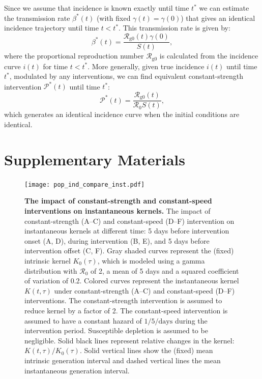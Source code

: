 \documentclass[12pt]{article}
\newcommand{\Rx}[1]{\ensuremath{{\mathcal R}_{#1}}\xspace}
\newcommand{\Ro}{\Rx{0}}
\newcommand{\Rcori}{\Rx{\mathrm{g0}}}
\newcommand{\PP}{\ensuremath{\mathcal P}}
\begin{document}
Since we assume that incidence is known exactly until time $t^\ast$ we can estimate the transmission rate $\beta^\ast(t)$ (with fixed $\gamma(t)=\gamma(0)$) that gives an identical incidence trajectory until time $t < t^\ast$.
This transmission rate is given by:
\begin{equation}
\beta^\ast(t) = \frac{\Rcori(t)\gamma(0)}{S(t)},
\end{equation}
where the proportional reproduction number $\Rcori$ is calculated from the incidence curve $i(t)$ for time $t < t^\ast$.
More generally, given true incidence $i(t)$ until time $t^\ast$, modulated by any interventions, we can find equivalent constant-strength intervention $\PP^\ast(t)$ until time $t^\ast$:
\begin{equation}
\PP^\ast(t) = \frac{\Rcori(t)}{\Ro S(t)},
\end{equation}
which generates an identical incidence curve when the initial conditions are identical.

\pagebreak

\section*{Supplementary Materials}
\setcounter{figure}{0}
\renewcommand{\thefigure}{S\arabic{figure}}


\begin{figure}[!th]
\texttt{[image: pop\_ind\_compare\_inst.pdf]}
\caption{
\textbf{The impact of constant-strength and constant-speed interventions on instantaneous kernels.}
The impact of constant-strength (A--C) and constant-speed (D--F) intervention on instantaneous kernels at different time:
5 days before intervention onset (A, D), during intervention (B, E), and 5 days before intervention offset (C, F).
Gray shaded curves represent the (fixed) intrinsic kernel $K_0(\tau)$, which is modeled using a gamma distribution with $\Ro$ of 2, a mean of 5 days and a squared coefficient of variation of 0.2.
Colored curves represent the instantaneous kernel $K(t, \tau)$ under constant-strength (A--C) and constant-speed (D--F) interventions.
The constant-strength intervention is assumed to reduce kernel by a factor of 2.
The constant-speed intervention is assumed to have a constant hazard of $1/5/\textrm{days}$ during the intervention period.
Susceptible depletion is assumed to be negligible.
Solid black lines represent relative changes in the kernel: $K(t, \tau)/K_0(\tau)$.
Solid vertical lines show the (fixed) mean intrinsic generation interval and dashed vertical lines the mean instantaneous generation interval.
}
\end{figure}

\pagebreak


\end{document}
